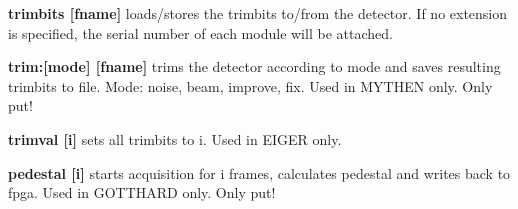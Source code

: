 \begin{DoxyItemize}
\item {\bfseries trimbits \mbox{[}fname\mbox{]} } loads/stores the trimbits to/from the detector. If no extension is specified, the serial number of each module will be attached.
\end{DoxyItemize}


\begin{DoxyItemize}
\item {\bfseries trim:\mbox{[}mode\mbox{]} \mbox{[}fname\mbox{]}} trims the detector according to mode and saves resulting trimbits to file. Mode: noise, beam, improve, fix. Used in MYTHEN only. Only put!
\end{DoxyItemize}


\begin{DoxyItemize}
\item {\bfseries trimval \mbox{[}i\mbox{]}} sets all trimbits to i. Used in EIGER only.
\end{DoxyItemize}


\begin{DoxyItemize}
\item {\bfseries pedestal \mbox{[}i\mbox{]}} starts acquisition for i frames, calculates pedestal and writes back to fpga. Used in GOTTHARD only. Only put! 
\end{DoxyItemize}